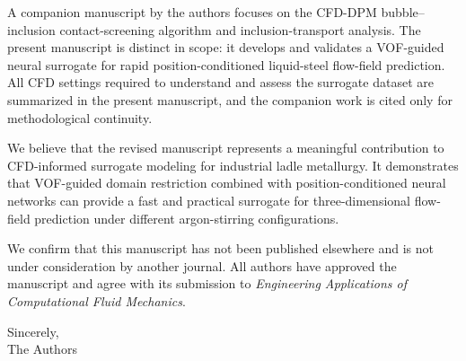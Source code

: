 \documentclass{article}
\begin{document}
A companion manuscript by the authors focuses on the CFD-DPM bubble--inclusion contact-screening algorithm and inclusion-transport analysis. The present manuscript is distinct in scope: it develops and validates a VOF-guided neural surrogate for rapid position-conditioned liquid-steel flow-field prediction. All CFD settings required to understand and assess the surrogate dataset are summarized in the present manuscript, and the companion work is cited only for methodological continuity.

We believe that the revised manuscript represents a meaningful contribution to CFD-informed surrogate modeling for industrial ladle metallurgy. It demonstrates that VOF-guided domain restriction combined with position-conditioned neural networks can provide a fast and practical surrogate for three-dimensional flow-field prediction under different argon-stirring configurations.

We confirm that this manuscript has not been published elsewhere and is not under consideration by another journal. All authors have approved the manuscript and agree with its submission to \textit{Engineering Applications of Computational Fluid Mechanics}.

\vspace{1em}
\noindent Sincerely,\\
The Authors
\end{document}
